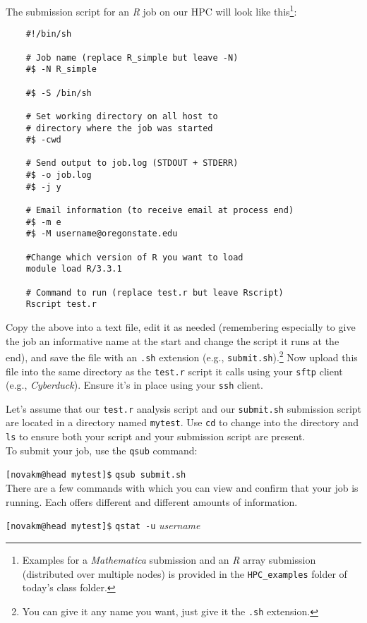 \documentclass[12pt,letterpaper]{article}
\begin{document}
The submission script for an \emph{R} job on our HPC will look like this\footnote{Examples for a \emph{Mathematica} submission and an \emph{R} array submission (distributed over multiple nodes) is provided in the \texttt{HPC\_examples} folder of today's class folder.}:
\begin{verbatim}
	#!/bin/sh

	# Job name (replace R_simple but leave -N)
	#$ -N R_simple

	#$ -S /bin/sh

	# Set working directory on all host to
	# directory where the job was started
	#$ -cwd

	# Send output to job.log (STDOUT + STDERR)
	#$ -o job.log
	#$ -j y

	# Email information (to receive email at process end)
	#$ -m e
	#$ -M username@oregonstate.edu

	#Change which version of R you want to load
	module load R/3.3.1

	# Command to run (replace test.r but leave Rscript)
	Rscript test.r
\end{verbatim}

Copy the above into a text file, edit it as needed (remembering especially to give the job an informative name at the start and change the script it runs at the end), and save the file with an \texttt{.sh} extension (e.g., \texttt{submit.sh}).\footnote{You can give it any name you want, just give it the \texttt{.sh} extension.}
Now upload this file into the same directory as the \texttt{test.r} script it calls using your \texttt{sftp} client (e.g., \emph{Cyberduck}).
Ensure it's in place using your \texttt{ssh} client.

Let's assume that our \texttt{test.r} analysis script and our \texttt{submit.sh} submission script are located in a directory named \texttt{mytest}.
Use \texttt{cd} to change into the directory and \texttt{ls} to ensure both your script and your submission script are present.\\

\noindent
To submit your job, use the \texttt{qsub} command:

\texttt{[novakm@head mytest]\$} \texttt{qsub submit.sh}
\\

\noindent
There are a few commands with which you can view and confirm that your job is running.
Each offers different and different amounts of information.

\texttt{[novakm@head mytest]\$} \texttt{qstat -u} \emph{username}
\end{document}
